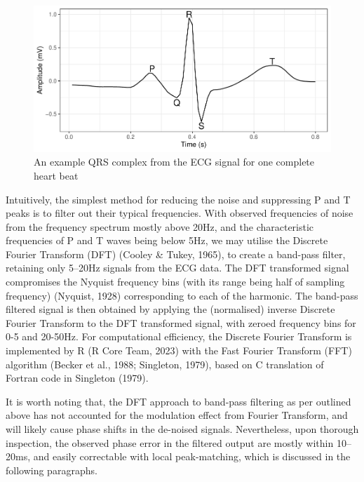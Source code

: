 \documentclass[
]{article}
\begin{document}
\begin{figure}

{\centering \includegraphics{report_files/figure-latex/qrs-1} 

}

\caption{An example QRS complex from the ECG signal for one complete heart beat}\label{fig:qrs}
\end{figure}

Intuitively, the simplest method for reducing the noise and suppressing
P and T peaks is to filter out their typical frequencies. With observed
frequencies of noise from the frequency spectrum mostly above 20Hz, and
the characteristic frequencies of P and T waves being below 5Hz, we may
utilise the Discrete Fourier Transform (DFT) (Cooley \& Tukey, 1965), to
create a band-pass filter, retaining only 5--20Hz signals from the ECG
data. The DFT transformed signal compromises the Nyquist frequency bins
(with its range being half of sampling frequency) (Nyquist, 1928)
corresponding to each of the harmonic. The band-pass filtered signal is
then obtained by applying the (normalised) inverse Discrete Fourier
Transform to the DFT transformed signal, with zeroed frequency bins for
0-5 and 20-50Hz. For computational efficiency, the Discrete Fourier
Transform is implemented by R (R Core Team, 2023) with the Fast Fourier
Transform (FFT) algorithm (Becker et al., 1988; Singleton, 1979), based
on C translation of Fortran code in Singleton (1979).

It is worth noting that, the DFT approach to band-pass filtering as per
outlined above has not accounted for the modulation effect from Fourier
Transform, and will likely cause phase shifts in the de-noised signals.
Nevertheless, upon thorough inspection, the observed phase error in the
filtered output are mostly within 10--20ms, and easily correctable with
local peak-matching, which is discussed in the following paragraphs.
\end{document}
